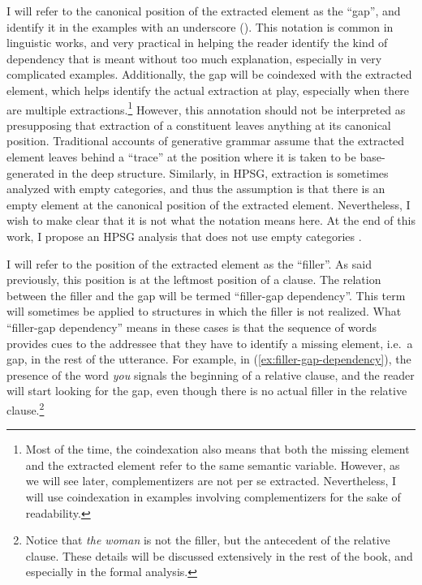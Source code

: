 I will refer to the canonical position of the extracted element as the ``gap'', and identify it in the examples with an underscore (\trace{}). This notation is common in linguistic works, and very practical in helping the reader identify the kind of dependency that is meant without too much explanation, especially in very complicated examples. Additionally, the gap will be coindexed with the extracted element, which helps identify the actual extraction at play, especially when there are multiple extractions.\footnote{Most of the time, the coindexation also means that both the missing element and the extracted element refer to the same semantic variable. However, as we will see later, complementizers are not per se extracted. Nevertheless, I will use coindexation in examples involving complementizers for the sake of readability.} However, this annotation should not be interpreted as presupposing that extraction of a constituent leaves anything at its canonical position. Traditional accounts of generative grammar assume that the extracted element leaves behind a ``trace'' at the position where it is taken to be base-generated in the deep structure. Similarly, in HPSG, extraction is sometimes analyzed with empty categories, and thus the assumption is that there is an empty element at the canonical position of the extracted element. Nevertheless, I wish to make clear that it is not what the notation means here. At the end of this work, I propose an HPSG analysis that does not use empty categories \citep{Sag.1994.Fodor,Sag.1994.Godard,Sag.2007,Sag.2010}.

I will refer to the position of the extracted element as the ``filler''. As said previously, this position is at the leftmost position of a clause. The relation between the filler and the gap will be termed ``filler-gap dependency''. This term will sometimes be applied to structures in which the filler is not realized. What ``filler-gap dependency'' means in these cases is that the sequence of words provides cues to the addressee that they have to identify a missing element, i.e.\ a gap, in the rest of the utterance. For example, in (\ref{ex:filler-gap-dependency}), the presence of the word \emph{you} signals the beginning of a relative clause, and the reader will start looking for the gap, even though there is no actual filler in the relative clause.\footnote{Notice that \emph{the woman} is not the filler, but the antecedent of the relative clause. These details will be discussed extensively in the rest of the book, and especially in the formal analysis.}

